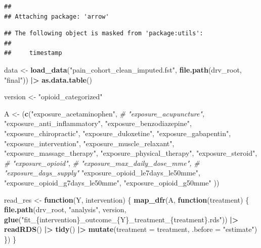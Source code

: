 \documentclass[
]{article}
\newenvironment{Shaded}{\begin{snugshade}}{\end{snugshade}}
\newcommand{\AttributeTok}[1]{\textcolor[rgb]{0.13,0.29,0.53}{#1}}
\newcommand{\CommentTok}[1]{\textcolor[rgb]{0.56,0.35,0.01}{\textit{#1}}}
\newcommand{\ControlFlowTok}[1]{\textcolor[rgb]{0.13,0.29,0.53}{\textbf{#1}}}
\newcommand{\FunctionTok}[1]{\textcolor[rgb]{0.13,0.29,0.53}{\textbf{#1}}}
\newcommand{\NormalTok}[1]{#1}
\newcommand{\OtherTok}[1]{\textcolor[rgb]{0.56,0.35,0.01}{#1}}
\newcommand{\SpecialCharTok}[1]{\textcolor[rgb]{0.81,0.36,0.00}{\textbf{#1}}}
\newcommand{\StringTok}[1]{\textcolor[rgb]{0.31,0.60,0.02}{#1}}
\begin{document}
\begin{verbatim}
## 
## Attaching package: 'arrow'
\end{verbatim}

\begin{verbatim}
## The following object is masked from 'package:utils':
## 
##     timestamp
\end{verbatim}

\begin{Shaded}
\begin{Highlighting}[]
\NormalTok{data }\OtherTok{\textless{}{-}} \FunctionTok{load\_data}\NormalTok{(}\StringTok{"pain\_cohort\_clean\_imputed.fst"}\NormalTok{, }\FunctionTok{file.path}\NormalTok{(drv\_root, }\StringTok{"final"}\NormalTok{)) }\SpecialCharTok{|\textgreater{}} \FunctionTok{as.data.table}\NormalTok{()}

\NormalTok{version }\OtherTok{\textless{}{-}} \StringTok{"opioid\_categorized"}

\NormalTok{A }\OtherTok{\textless{}{-}}\NormalTok{ (}\FunctionTok{c}\NormalTok{(}\StringTok{"exposure\_acetaminophen"}\NormalTok{,}
        \CommentTok{\# "exposure\_acupuncture",}
        \StringTok{"exposure\_anti\_inflammatory"}\NormalTok{,}
        \StringTok{"exposure\_benzodiazepine"}\NormalTok{,}
        \StringTok{"exposure\_chiropractic"}\NormalTok{,}
        \StringTok{"exposure\_duloxetine"}\NormalTok{,}
        \StringTok{"exposure\_gabapentin"}\NormalTok{,}
        \StringTok{"exposure\_intervention"}\NormalTok{,}
        \StringTok{"exposure\_muscle\_relaxant"}\NormalTok{,}
        \StringTok{"exposure\_massage\_therapy"}\NormalTok{,}
        \StringTok{"exposure\_physical\_therapy"}\NormalTok{,}
        \StringTok{"exposure\_steroid"}\NormalTok{,}
        \CommentTok{\# "exposure\_opioid",}
        \CommentTok{\# "exposure\_max\_daily\_dose\_mme",}
        \CommentTok{\# "exposure\_days\_supply"}
        \StringTok{"exposure\_opioid\_le7days\_le50mme"}\NormalTok{,}
        \StringTok{"exposure\_opioid\_g7days\_le50mme"}\NormalTok{,}
        \StringTok{"exposure\_opioid\_g50mme"}
\NormalTok{))}

\NormalTok{read\_res }\OtherTok{\textless{}{-}} \ControlFlowTok{function}\NormalTok{(Y, intervention) \{}
  \FunctionTok{map\_dfr}\NormalTok{(A, }\ControlFlowTok{function}\NormalTok{(treatment) \{}
    \FunctionTok{file.path}\NormalTok{(drv\_root, }\StringTok{"analysis"}\NormalTok{, version,}
              \FunctionTok{glue}\NormalTok{(}\StringTok{"fit\_\{intervention\}\_outcome\_\{Y\}\_treatment\_\{treatment\}.rds"}\NormalTok{)) }\SpecialCharTok{|\textgreater{}} 
      \FunctionTok{readRDS}\NormalTok{() }\SpecialCharTok{|\textgreater{}} 
      \FunctionTok{tidy}\NormalTok{() }\SpecialCharTok{|\textgreater{}} 
      \FunctionTok{mutate}\NormalTok{(}\AttributeTok{treatment =}\NormalTok{ treatment, }\AttributeTok{.before =} \StringTok{"estimate"}\NormalTok{)}
\NormalTok{  \})}
\NormalTok{\}}


\end{Highlighting}
\end{Shaded}
\end{document}
